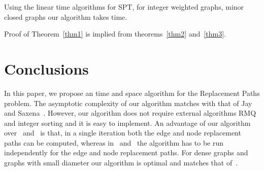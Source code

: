\documentclass[11pt,a4paper]{llncs}
\begin{document}
Using the linear time algorithms for SPT, for integer weighted graphs,
minor closed graphs our algorithm takes  time.

Proof of Theorem~\ref{thm1} is implied from theorems~\ref{thm2} and~\ref{thm3}.


\section{Conclusions}
\label{conc}
In this paper, we propose an  time  and 
space algorithm for the Replacement Paths problem. The asymptotic complexity of our algorithm matches
with that of Jay and Saxena~\cite{jay}. However,
our algorithm does not require external algorithms RMQ and integer sorting and it is easy to implement.
An advantage of our algorithm over~\cite{jay} and~\cite{linearrsp} is that, in a single iteration
both the edge and node replacement paths can be computed, whereas in~\cite{jay} and~\cite{linearrsp}
the algorithm has to be run independently for the edge and node replacement paths.
For dense graphs and graphs with small diameter our algorithm is optimal and matches that of~\cite{linearrsp}.


\end{document}
